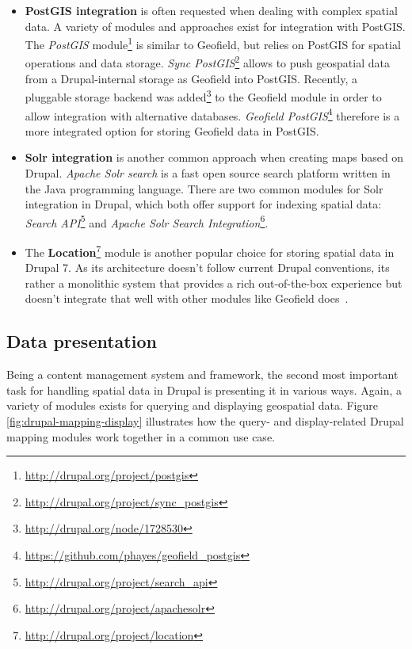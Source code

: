 \begin{itemize}

\item \textbf{PostGIS integration} is often requested when dealing with complex spatial data. A variety of modules and approaches exist for integration with PostGIS. The \textit{PostGIS} module\footnote{\url{http://drupal.org/project/postgis}} is similar to Geofield, but relies on PostGIS for spatial operations and data storage. \textit{Sync PostGIS}\footnote{\url{http://drupal.org/project/sync_postgis}} allows to push geospatial data from a Drupal-internal storage as Geofield into PostGIS. Recently, a pluggable storage backend was added\footnote{\url{http://drupal.org/node/1728530}} to the Geofield module in order to allow integration with alternative databases. \textit{Geofield PostGIS}\footnote{\url{https://github.com/phayes/geofield_postgis}} therefore is a more integrated option for storing Geofield data in PostGIS.

\item \textbf{Solr integration} is another common approach when creating maps based on Drupal. \textit{Apache Solr search} is a fast open source search platform written in the Java programming language. There are two common modules for Solr integration in Drupal, which both offer support for indexing spatial data: \textit{Search API}\footnote{\url{http://drupal.org/project/search_api}} and \textit{Apache Solr Search Integration}\footnote{\url{http://drupal.org/project/apachesolr}}.

\item The \textbf{Location}\footnote{\url{http://drupal.org/project/location}} module is another popular choice for storing spatial data in Drupal 7. As its architecture doesn't follow current Drupal conventions, its rather a monolithic system that provides a rich out-of-the-box experience but doesn't integrate that well with other modules like Geofield does~\cite{Zzolo11mappingdrupal}.

\end{itemize}

\subsection{Data presentation}

Being a content management system and framework, the second most important task for handling spatial data in Drupal is presenting it in various ways. Again, a variety of modules exists for querying and displaying geospatial data. Figure \ref{fig:drupal-mapping-display} illustrates how the query- and display-related Drupal mapping modules work together in a common use case.

